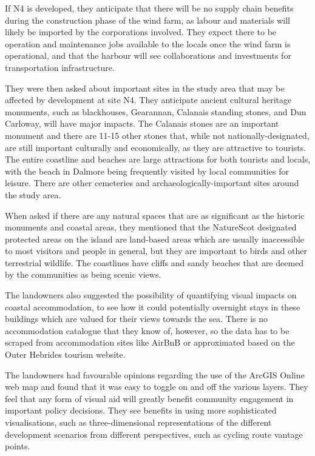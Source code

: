 If N4 is developed, they anticipate that there will be no supply chain benefits
during the construction phase of the wind farm, as labour and materials will
likely be imported by the corporations involved. They expect there to be
operation and maintenance jobs available to the locals once the wind farm is
operational, and that the harbour will see collaborations and investments for
transportation infrastructure.

They were then asked about important sites in the study area that may be
affected by development at site N4. They anticipate ancient cultural heritage
monuments, such as blackhouses, Gearannan, Calanais standing stones, and Dun
Carloway, will have major impacts. The Calanais stones are an important
monument and there are 11-15 other stones that, while not
nationally-designated, are still important culturally and economically, as they
are attractive to tourists. The entire coastline and beaches are large
attractions for both tourists and locals, with the beach in Dalmore being
frequently visited by local communities for leisure. There are other cemeteries
and archaeologically-important sites around the study area.

When asked if there are any natural spaces that are as significant as the
historic monuments and coastal areas, they mentioned that the NatureScot
designated protected areas on the island are land-based areas which are usually
inaccessible to most visitors and people in general, but they are important to
birds and other terrestrial wildlife. The coastlines have cliffs and sandy
beaches that are deemed by the communities as being scenic views.

The landowners also suggested the possibility of quantifying visual impacts on
coastal accommodation, to see how it could potentially overnight stays in these
buildings which are valued for their views towards the sea. There is no
accommodation catalogue that they know of, however, so the data has to be
scraped from accommodation sites like AirBnB or approximated based on the Outer
Hebrides tourism website.

The landowners had favourable opinions regarding the use of the ArcGIS Online
web map and found that it was easy to toggle on and off the various layers.
They feel that any form of visual aid will greatly benefit community engagement
in important policy decisions. They see benefits in using more sophisticated
visualisations, such as three-dimensional representations of the different
development scenarios from different perspectives, such as cycling route
vantage points.

